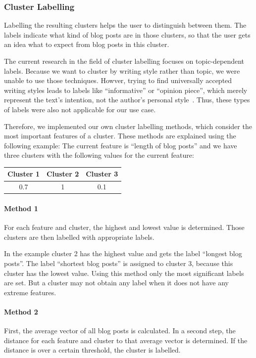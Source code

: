 
\subsubsection{Cluster Labelling}
\label{sec:cluster_labeling}
Labelling the resulting clusters helps the user to distinguish between them.
The labels indicate what kind of blog posts are in those clusters, so that the user gets an idea what to expect from blog posts in this cluster.

The current research in the field of cluster labelling focuses on topic-dependent labels.
Because we want to cluster by writing style rather than topic, we were unable to use those techniques.
Howver, trying to find universally accepted writing styles leads to labels like ``informative'' or ``opinion piece'', which merely represent the text's intention, not the author's personal style~\cite{lee2001genres}.
Thus, these types of labels were also not applicable for our use case.

Therefore, we implemented our own cluster labelling methods, which consider the most important features of a cluster.
These methods are explained using the following example:
The current feature is ``length of blog posts'' and we have three clusters with the following values for the current feature:
\begin{center}
\begin{tabular}{c|c|c}
  Cluster 1 & Cluster 2 & Cluster 3 \\ \hline
  0.7 & 1 & 0.1 \\
 \end{tabular}
\end{center}
\paragraph{Method 1}
For each feature and cluster, the highest and lowest value is determined.
Those clusters are then labelled with appropriate labels.

In the example cluster 2 has the highest value and gets the label ``longest blog posts''.
The label ``shortest blog posts'' is assigned to cluster 3, because this cluster has the lowest value.
Using this method only the most significant labels are set.
But a cluster may not obtain any label when it does not have any extreme features.

\paragraph{Method 2}
First, the average vector of all blog posts is calculated.
In a second step, the distance for each feature and cluster to that average vector is determined.
If the distance is over a certain threshold, the cluster is labelled.

